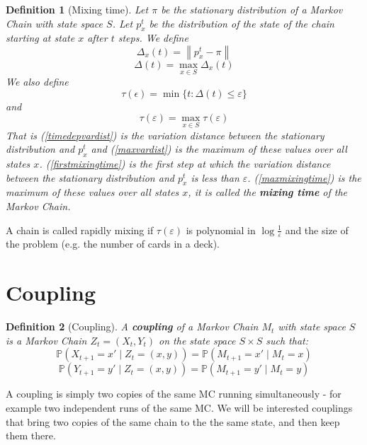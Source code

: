 \documentclass[11pt]{article}
\newcommand{\norm}[1]{\left\lVert#1\right\rVert}
\newtheorem{definition}{Definition}[section]
\begin{document}
\begin{definition}[Mixing time]
Let \(\pi\) be the stationary distribution of a Markov Chain with state space \(S\). Let \(p_x^t\) be the distribution of the state of the chain starting at state \(x\) after \(t\) steps. We define
\begin{equation}
\Delta_x\left(t\right) = \norm{p_x^t - \pi}
\label{timedepvardist} 
\end{equation}
\begin{equation}
\Delta\left(t\right) = \underset{x \in S}{\operatorname{max}} \Delta_x\left(t\right)
\label{maxvardist}
\end{equation}
We also define
\begin{equation}
\tau\left(\epsilon\right) = \min{\{t:\Delta\left(t\right)\leq \varepsilon\}} 
\label{firstmixingtime}
\end{equation}
and
\begin{equation}
\tau	\left(\varepsilon\right) = \underset{x \in S}{\operatorname{max}} \tau\left(\varepsilon\right)
\label{maxmixingtime}
\end{equation}
That is (\ref{timedepvardist}) is the variation distance between the stationary distribution and \(p_x^t\) and (\ref{maxvardist}) is the maximum of these values over all states \(x\). (\ref{firstmixingtime}) is the first step at which the variation distance between the stationary distribution and \(p_x^t\) is less than \(\varepsilon\). (\ref{maxmixingtime}) is the maximum of these values over all states \(x\), it is called the \textbf{mixing time} of the Markov Chain.
\end{definition}
A chain is called rapidly mixing if \(\tau	\left(\varepsilon\right) \) is polynomial in \(\log{\frac{1}{\varepsilon}}\) and the size of the problem (e.g. the number of cards in a deck).
\section{Coupling}
\begin{definition}[Coupling]
A \textbf{coupling} of a Markov Chain \(M_t\) with state space \(S\) is a Markov Chain \(Z_t = \left(X_t,Y_t\right)\) on the state space \(S \times S\) such that:
\begin{equation}
\mathbb{P}\left(X_{t+1}=x'\mid Z_t =\left(x,y\right) \right) = \mathbb{P}\left(M_{t+1}=x'\mid M_t =x \right) 
\end{equation}
\begin{equation}
\mathbb{P}\left(Y_{t+1}=y'\mid Z_t =\left(x,y\right) \right) = \mathbb{P}\left(M_{t+1}=y'\mid M_t =y \right) 
\end{equation}
\end{definition}
A coupling is simply two copies of the same MC running simultaneously - for example two independent runs of the same MC. We will be interested couplings that bring two copies of the same chain to the the same state, and then keep them there. 
\end{document}
